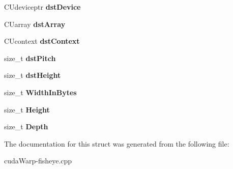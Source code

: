 \begin{DoxyCompactItemize}
\item 
C\+Udeviceptr {\bfseries dst\+Device}\hypertarget{structCUDA__MEMCPY3D__PEER__st_ab03344cdc5fad68f61d608f3286025fa}{}\label{structCUDA__MEMCPY3D__PEER__st_ab03344cdc5fad68f61d608f3286025fa}

\item 
C\+Uarray {\bfseries dst\+Array}\hypertarget{structCUDA__MEMCPY3D__PEER__st_a1c501f4b5a7c625a146db59c221f7310}{}\label{structCUDA__MEMCPY3D__PEER__st_a1c501f4b5a7c625a146db59c221f7310}

\item 
C\+Ucontext {\bfseries dst\+Context}\hypertarget{structCUDA__MEMCPY3D__PEER__st_a392368ab93a61987c3c8a5b7cc7ca080}{}\label{structCUDA__MEMCPY3D__PEER__st_a392368ab93a61987c3c8a5b7cc7ca080}

\item 
size\+\_\+t {\bfseries dst\+Pitch}\hypertarget{structCUDA__MEMCPY3D__PEER__st_a5743894af69dd4b19d0f2cd343804bf3}{}\label{structCUDA__MEMCPY3D__PEER__st_a5743894af69dd4b19d0f2cd343804bf3}

\item 
size\+\_\+t {\bfseries dst\+Height}\hypertarget{structCUDA__MEMCPY3D__PEER__st_a98fc855b8fc89219cb710d54c95bfb40}{}\label{structCUDA__MEMCPY3D__PEER__st_a98fc855b8fc89219cb710d54c95bfb40}

\item 
size\+\_\+t {\bfseries Width\+In\+Bytes}\hypertarget{structCUDA__MEMCPY3D__PEER__st_ac76988438a25c0427cab288cdaac9a61}{}\label{structCUDA__MEMCPY3D__PEER__st_ac76988438a25c0427cab288cdaac9a61}

\item 
size\+\_\+t {\bfseries Height}\hypertarget{structCUDA__MEMCPY3D__PEER__st_a30e81dc7a36be8388ed7f4607e8b8244}{}\label{structCUDA__MEMCPY3D__PEER__st_a30e81dc7a36be8388ed7f4607e8b8244}

\item 
size\+\_\+t {\bfseries Depth}\hypertarget{structCUDA__MEMCPY3D__PEER__st_a7ba584e5c1128ca307237776f3adf31e}{}\label{structCUDA__MEMCPY3D__PEER__st_a7ba584e5c1128ca307237776f3adf31e}

\end{DoxyCompactItemize}


The documentation for this struct was generated from the following file\+:\begin{DoxyCompactItemize}
\item 
cuda\+Warp-\/fisheye.\+cpp\end{DoxyCompactItemize}

